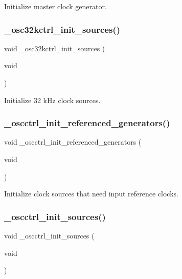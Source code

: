 Initialize master clock generator. 

\mbox{\label{group___h_p_l_gaab304aa890beb23e3311aaa2c0def527}} 
\subsubsection{\texorpdfstring{\+\_\+osc32kctrl\+\_\+init\+\_\+sources()}{\_osc32kctrl\_init\_sources()}}
{\footnotesize\ttfamily void \+\_\+osc32kctrl\+\_\+init\+\_\+sources (\begin{DoxyParamCaption}\item[{void}]{ }\end{DoxyParamCaption})}



Initialize 32 k\+Hz clock sources. 

\mbox{\label{group___h_p_l_ga2e4746bc23999fe1dc7c02aa4e167bfb}} 
\subsubsection{\texorpdfstring{\+\_\+oscctrl\+\_\+init\+\_\+referenced\+\_\+generators()}{\_oscctrl\_init\_referenced\_generators()}}
{\footnotesize\ttfamily void \+\_\+oscctrl\+\_\+init\+\_\+referenced\+\_\+generators (\begin{DoxyParamCaption}\item[{void}]{ }\end{DoxyParamCaption})}



Initialize clock sources that need input reference clocks. 

\mbox{\label{group___h_p_l_gaee0105b1dbc07a2ca23586aa95f49cc7}} 
\subsubsection{\texorpdfstring{\+\_\+oscctrl\+\_\+init\+\_\+sources()}{\_oscctrl\_init\_sources()}}
{\footnotesize\ttfamily void \+\_\+oscctrl\+\_\+init\+\_\+sources (\begin{DoxyParamCaption}\item[{void}]{ }\end{DoxyParamCaption})}



